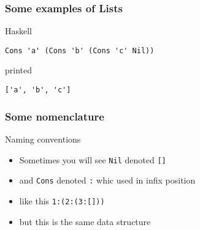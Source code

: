 \begin{frame}[fragile]
\frametitle{Some examples of Lists}
\begin{block}{Haskell}
\begin{lstlisting}[style=haskell,basicstyle=\scriptsize\ttfamily,mathescape]
Cons 'a' (Cons 'b' (Cons 'c' Nil))
\end{lstlisting}
\end{block}
\begin{block}{printed}
\begin{lstlisting}[style=haskell,basicstyle=\scriptsize\ttfamily,mathescape]
['a', 'b', 'c']
\end{lstlisting}
\end{block}
\end{frame}

\begin{frame}
\frametitle{Some nomenclature}
\begin{block}{Naming conventions}
\begin{itemize}
\item<1-> Sometimes you will see \lstinline{Nil} denoted \lstinline{[]}
\item<2-> and \lstinline{Cons} denoted \lstinline{:} whic used in infix position
\item<3-> like this \lstinline{1:(2:(3:[]))}
\item<4-> but this is the same data structure
\end{itemize}
\end{block}
\end{frame}
